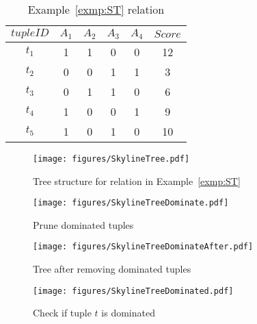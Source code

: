 \begin{table}[!t]
\centering
\caption{Example~\ref{exmp:ST} relation}\label{tab:skylineTreeRunningExample}
\begin{tiny}
\begin{tabular}{cccccc}
    \hline 
    $tupleID$ & $A_1$ & $A_2$ & $A_3$ & $A_4$ & $Score$\\
    \hline 
    $t_1$ & 1 & 1 & 0 & 0 & 12\\
    \hline
    $t_2$ & 0 & 0 & 1 & 1 & 3\\
    \hline
    $t_3$ & 0 & 1 & 1 & 0 & 6\\
    \hline
    $t_4$ & 1 & 0 & 0 & 1 & 9\\
    \hline
    $t_5$ & 1 & 0 & 1 & 0 & 10\\
    \hline
\end{tabular}
\end{tiny}
\end{table}

\begin{figure*}[!t]
\begin{minipage}[t]{0.23\linewidth}
\centering
    \texttt{[image: figures/SkylineTree.pdf]}
    \caption{Tree structure for relation in Example~\ref{exmp:ST}}
    \label{fig:tree}
\end{minipage}
\hspace{1mm}
\begin{minipage}[t]{0.23\linewidth}
\centering
    \texttt{[image: figures/SkylineTreeDominate.pdf]}
    \caption{Prune dominated tuples}
    \label{fig:treePruneDominatedTuples}
\end{minipage}
\hspace{1mm}
\begin{minipage}[t]{0.23\linewidth}
\centering
    \texttt{[image: figures/SkylineTreeDominateAfter.pdf]}
    \caption{Tree after removing dominated tuples}
    \label{fig:treePruneDominatedTuplesAfter}
\end{minipage}
\hspace{1mm}
\begin{minipage}[t]{0.23\linewidth}
\centering
    \texttt{[image: figures/SkylineTreeDominated.pdf]}
    \caption{Check if tuple $t$ is dominated}
    \label{fig:treeCheckIfDominated}
\end{minipage}
\end{figure*}



